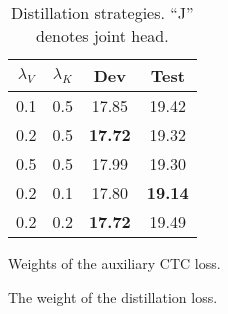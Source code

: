 \documentclass{article}
\begin{document}
\begin{table}[t]
\begin{subtable}[b]{0.25\textwidth}
{    \begin{tabular}{cc|cc}
    \toprule
    $\lambda_V$ & $\lambda_K$ & Dev & Test \\
    \midrule
    0.1 & 0.5 & 17.85 & 19.42 \\
    0.2 & 0.5 & \textbf{17.72} & 19.32 \\
    0.5 & 0.5 & 17.99 & 19.30 \\
    0.2 & 0.1 & 17.80 & \textbf{19.14} \\
    0.2 & 0.2 & \textbf{17.72} & 19.49 \\
    \bottomrule
    \end{tabular}}
    \caption{Weights of the auxiliary CTC loss.}
    \label{tab:lossw}
    \end{subtable}
    \hfill
    \begin{subtable}[b]{0.3\textwidth}
\centering
    \caption{The weight of the distillation loss.}
    \label{tab:weights_dist_loss}
    \end{subtable}
    \hfill
    \begin{subtable}[b]{0.4\textwidth}
    \centering
    \caption{Distillation strategies. ``J'' denotes joint head.}
    \label{tab:dist}
    \end{subtable}
\end{table}
\end{document}
